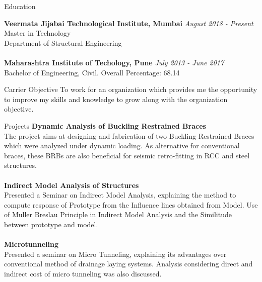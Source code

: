 \documentclass{resume} %
\begin{document}

\begin{rSection}{Education}

  {\bf Veermata Jijabai Technological Institute, Mumbai} \hfill {\em August 2018 - Present}
  \\ Master in Technology
  \\ Department of Structural Engineering\\
  \\{\bf Maharashtra Institute of Techology, Pune} \hfill {\em July 2013 - June 2017}
  \\ Bachelor of Engineering, Civil.\hfill { Overall Percentage: 68.14 }


\end{rSection}

\begin{rSection}{Carrier Objective}
  To work for an organization which provides me the opportunity to improve my skills and knowledge to grow along with the organization objective.
\end{rSection}
\begin{rSection}{Projects}
  {\bf Dynamic Analysis of Buckling Restrained Braces}
  \\The project aims at designing and fabrication of two Buckling Restrained Braces which were analyzed under dynamic loading. As alternative for conventional braces, these BRBs are also beneficial for seismic retro-fitting in RCC and steel structures.\\
  \\{\bf Indirect Model Analysis of Structures}\\
  Presented a Seminar on Indirect Model Analysis, explaining the method to compute response of Prototype from the Influence lines obtained from Model. Use of Muller Breslau Principle in Indirect Model Analysis and the Similitude between prototype and  model.\\

  \\{\bf Microtunneling}\\
  Presented a seminar on Micro Tunneling, explaining its advantages over conventional method of drainage laying systems. Analysis considering direct and indirect cost of micro tunneling was also discussed.

\end{rSection}
\end{document}
